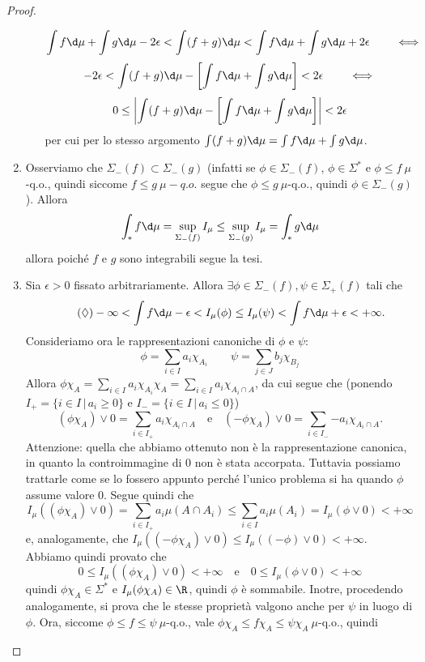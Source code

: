 \begin{proof}
\begin{enumerate}
\begin{itemize}
            \[\int f\d\mu  +\int g\d \mu -2\epsilon < \int(f+g)\d \mu <\int f\d\mu  +\int g\d \mu + 2\epsilon \qquad \iff\]
            \[-2\epsilon < \int(f+g)\d\mu-\left[\int f \d \mu + \int g \d \mu\right] < 2\epsilon\qquad \iff\]
            \[0\leq \left|\int(f+g)\d\mu-\left[\int f \d \mu + \int g \d \mu\right]\right|<2\epsilon\]
            per cui per lo stesso argomento $\int(f+g)\d\mu=\int f \d \mu + \int g \d \mu$.
        \end{itemize}
        \item Osserviamo che $\Sigma_-(f)\subset \Sigma_-(g)$ (infatti se $\phi \in \Sigma_-(f)$, $\phi \in \Sigma^*$ e $\phi\leq f\ \mu$-q.o., quindi siccome $f\leq g\ \mu-q.o.$ segue che $\phi\leq g\ \mu$-q.o., quindi $\phi \in \Sigma_-(g)$). Allora 
        \[\int_*f\d\mu = \sup_{\Sigma_-(f)}I_\mu \leq \sup_{\Sigma_-(g)}I_{\mu}=\int_*g\d\mu\]
        allora poiché $f$ e $g$ sono integrabili segue la tesi.
        \item Sia $\epsilon >0$ fissato arbitrariamente. Allora $\exists \phi \in \Sigma_-(f), \psi \in \Sigma_+(f)$ tali che 
        \[\tag{$\lozenge$} -\infty<\int f\d\mu-\epsilon <I_\mu(\phi)\leq I_{\mu}(\psi)<\int f\d\mu+\epsilon<+\infty.\]
        Consideriamo ora le rappresentazioni canoniche di $\phi$ e $\psi$:
        \[\phi = \sum_{i\in I}a_i\chi_{A_i} \qquad \psi = \sum_{j\in J}b_j\chi_{B_j}\]
        Allora $\phi\chi_{A}=\sum_{i\in I}a_i\chi_{A_i}\chi_A=\sum_{i\in I}a_i\chi_{A_i\cap A}$, da cui segue che (ponendo $I_+ = \{i\in I\,|\, a_i\geq 0\}$ e $I_- = \{i\in I\,|\, a_i\leq 0\}$)
        \[(\phi\chi_A)\vee 0 = \sum_{i\in I_+}a_i\chi_{A_i\cap A} \quad \text{e}\quad (-\phi\chi_A)\vee 0 = \sum_{i\in I_-}{-a_i}\chi_{A_i\cap A}.\]
        Attenzione: quella che abbiamo ottenuto non è la rappresentazione canonica, in quanto la controimmagine di $0$ non è stata accorpata. Tuttavia possiamo trattarle come se lo fossero appunto perché l'unico problema si ha quando $\phi$ assume valore $0$. Segue quindi che 
        \[I_\mu((\phi\chi_A)\vee 0) = \sum_{i\in I_+}a_i\mu(A\cap A_i)\leq \sum_{i\in I}a_i\mu(A_i)=I_{\mu}(\phi\vee 0)<+\infty\]
        e, analogamente, che $I_\mu((-\phi\chi_A)\vee 0)\leq I_\mu((-\phi)\vee 0)<+\infty$. Abbiamo quindi provato che 
        \[0\leq I_{\mu}((\phi\chi_A)\vee 0)<+\infty\quad \text{e}\quad 0\leq I_\mu(\phi\vee 0)<+\infty\]
        quindi $\phi\chi_A\in \Sigma^*$ e $I_\mu(\phi\chi_A)\in \R$, quindi $\phi$ è sommabile. Inotre, procedendo analogamente, si prova che le stesse proprietà valgono anche per $\psi$ in luogo di $\phi$. Ora, siccome $\phi\leq f\leq \psi\ \mu$-q.o., vale $\phi\chi_A\leq f\chi_A\leq \psi\chi_A\ \mu$-q.o., quindi 

\end{enumerate}
\end{proof}
